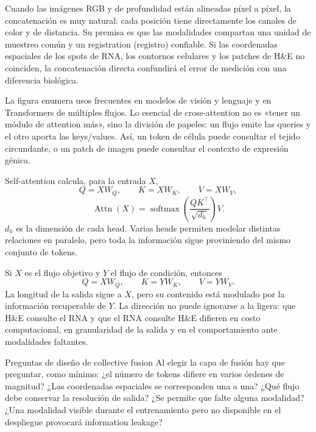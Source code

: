 Cuando las imágenes RGB y de profundidad están alineadas píxel a píxel, la concatenación es muy natural: cada posición tiene directamente los canales de color y de distancia. Su premisa es que las modalidades compartan una unidad de muestreo común y un registration (registro) confiable. Si las coordenadas espaciales de los spots de RNA, los contornos celulares y los patches de H\&E no coinciden, la concatenación directa confundirá el error de medición con una diferencia biológica.


La figura enumera usos frecuentes en modelos de visión y lenguaje y en Transformers de múltiples flujos. Lo esencial de cross-attention no es «tener un módulo de attention más», sino la división de papeles: un flujo emite las queries y el otro aporta las keys/values. Así, un token de célula puede consultar el tejido circundante, o un patch de imagen puede consultar el contexto de expresión génica.


Self-attention calcula, para la entrada $X$,
\[
Q=XW_Q,\qquad K=XW_K,\qquad V=XW_V,
\]
\[
\operatorname{Attn}(X)=\operatorname{softmax}\!\left(\frac{QK^\top}{\sqrt{d_h}}\right)V.
\]
$d_h$ es la dimensión de cada head. Varias heads permiten modelar distintas relaciones en paralelo, pero toda la información sigue proviniendo del mismo conjunto de tokens.


Si $X$ es el flujo objetivo y $Y$ el flujo de condición, entonces
\[
Q=XW_Q,\qquad K=YW_K,\qquad V=YW_V.
\]
La longitud de la salida sigue a $X$, pero su contenido está modulado por la información recuperable de $Y$. La dirección no puede ignorarse a la ligera: que H\&E consulte el RNA y que el RNA consulte H\&E difieren en costo computacional, en granularidad de la salida y en el comportamiento ante modalidades faltantes.

\begin{knowledgebox}{Preguntas de diseño de collective fusion}
Al elegir la capa de fusión hay que preguntar, como mínimo: ¿el número de tokens difiere en varios órdenes de magnitud? ¿Las coordenadas espaciales se corresponden una a una? ¿Qué flujo debe conservar la resolución de salida? ¿Se permite que falte alguna modalidad? ¿Una modalidad visible durante el entrenamiento pero no disponible en el despliegue provocará information leakage?
\end{knowledgebox}

